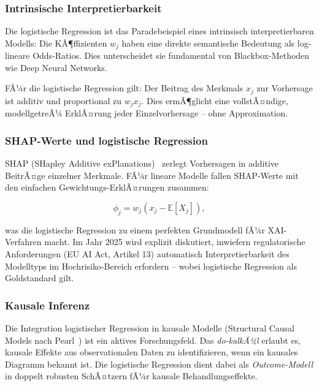﻿\documentclass[12pt, a4paper]{article}
\theoremstyle{definition}
\theoremstyle{remark}
\newcommand{\E}{\mathbb{E}}
\begin{document}
\subsubsection{Intrinsische Interpretierbarkeit}

Die logistische Regression ist das Paradebeispiel eines intrinsisch interpretierbaren Modells:
Die KÃ¶ffizienten $w_j$ haben eine direkte semantische Bedeutung als log-lineare Odds-Ratios.
Dies unterscheidet sie fundamental von Blackbox-Methoden wie Deep Neural Networks.

\begin{tcolorbox}[notebox, title={Interpretierbarkeitsgarantie}]
  FÃ¼r die logistische Regression gilt: Der Beitrag des Merkmals $x_j$ zur Vorhersage
  ist additiv und proportional zu $w_j x_j$. Dies ermÃ¶glicht eine vollstÃ¤ndige, modellgetreÃ¼
  ErklÃ¤rung jeder Einzelvorhersage -- ohne Approximation.
\end{tcolorbox}

\subsubsection{SHAP-Werte und logistische Regression}

SHAP (SHapley Additive exPlanations)~\citep{lundberg2017unified} zerlegt Vorhersagen in
additive BeitrÃ¤ge einzelner Merkmale. FÃ¼r lineare Modelle fallen SHAP-Werte mit den
einfachen Gewichtungs-ErklÃ¤rungen zusammen:

\begin{equation}
  \phi_j = w_j(x_j - \E[X_j]),
  \label{eq:shap_linear}
\end{equation}

was die logistische Regression zu einem perfekten Grundmodell fÃ¼r XAI-Verfahren macht.
Im Jahr 2025 wird explizit diskutiert, inwiefern regulatorische Anforderungen (EU AI Act,
Artikel 13) automatisch Interpretierbarkeit des Modelltyps im Hochrisiko-Bereich erfordern
-- wobei logistische Regression als Goldstandard gilt.

\subsubsection{Kausale Inferenz}

Die Integration logistischer Regression in kausale Modelle (Structural Causal Models nach
Pearl~\citep{pearl2009causality}) ist ein aktives Forschungsfeld. Das \emph{do-kalkÃ¼l}
erlaubt es, kausale Effekte aus observationalen Daten zu identifizieren, wenn ein kausales
Diagramm bekannt ist. Die logistische Regression dient dabei als \emph{Outcome-Modell} in
doppelt robusten SchÃ¤tzern fÃ¼r kausale Behandlungseffekte.
\end{document}
